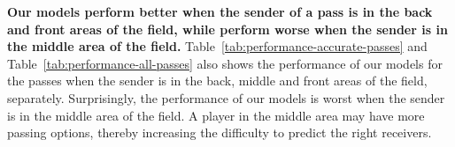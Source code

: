 \textbf{Our models perform better when the sender of a pass is in the back and front areas of the field, while perform worse when the sender is in the middle area of the field.}
Table~\ref{tab:performance-accurate-passes} and Table~\ref{tab:performance-all-passes} also shows the performance of our models for the passes when the sender is in the back, middle and front areas of the field, separately.
Surprisingly, the performance of our models is worst when the sender is in the middle area of the field. A player in the middle area may have more passing options, thereby increasing the difficulty to predict the right receivers.

